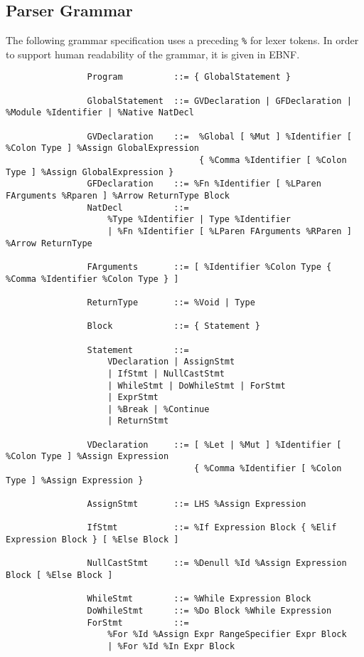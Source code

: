 \documentclass{article}
\begin{document}
		\subsection{Parser Grammar}
		
			The following grammar specification uses a preceding \texttt{\%} for lexer tokens. In order to support human readability of the grammar, it is given in EBNF.
		
			\begin{small}\begin{verbatim}
				Program          ::= { GlobalStatement }
				                 
				GlobalStatement  ::= GVDeclaration | GFDeclaration | %Module %Identifier | %Native NatDecl
				                 
				GVDeclaration    ::=  %Global [ %Mut ] %Identifier [ %Colon Type ] %Assign GlobalExpression
				                      { %Comma %Identifier [ %Colon Type ] %Assign GlobalExpression }
				GFDeclaration    ::= %Fn %Identifier [ %LParen FArguments %Rparen ] %Arrow ReturnType Block
				NatDecl          ::=
				    %Type %Identifier | Type %Identifier
				    | %Fn %Identifier [ %LParen FArguments %RParen ] %Arrow ReturnType
				                 
				FArguments       ::= [ %Identifier %Colon Type { %Comma %Identifier %Colon Type } ]
				
				ReturnType       ::= %Void | Type
				                 
				Block            ::= { Statement }
				
				Statement        ::=
				    VDeclaration | AssignStmt
				    | IfStmt | NullCastStmt
				    | WhileStmt | DoWhileStmt | ForStmt
				    | ExprStmt
				    | %Break | %Continue
				    | ReturnStmt
				                 
				VDeclaration     ::= [ %Let | %Mut ] %Identifier [ %Colon Type ] %Assign Expression
				                     { %Comma %Identifier [ %Colon Type ] %Assign Expression }
				                 
				AssignStmt       ::= LHS %Assign Expression
				                 
				IfStmt           ::= %If Expression Block { %Elif Expression Block } [ %Else Block ]
				                 
				NullCastStmt     ::= %Denull %Id %Assign Expression Block [ %Else Block ]
				                 
				WhileStmt        ::= %While Expression Block
				DoWhileStmt      ::= %Do Block %While Expression
				ForStmt          ::=
				    %For %Id %Assign Expr RangeSpecifier Expr Block
				    | %For %Id %In Expr Block
				                 

\end{verbatim}
\end{small}
\end{document}
